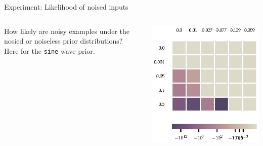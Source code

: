 \documentclass{beamer}
\begin{document}
    \begin{frame}{Experiment: Likelihood of noised inputs}
        \begin{columns}
            \begin{column}{0.5\textwidth}
                How likely are noisy examples under the nosied or noiseless prior distributions?\\
                Here for the \texttt{sine} wave prior.
            \end{column}
            \begin{column}{0.5\textwidth}
                \includegraphics[width=\textwidth]{noised_noised/sin_hm.eps}%
            \end{column}
        \end{columns}
    \end{frame}
\end{document}
